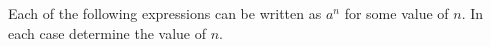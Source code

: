 \question Each of the following expressions can be written as 
$a^{n}$ for some value of $n$. 
In each case determine the value of $n$.
\begin{multicols}{4}
\end{multicols}

